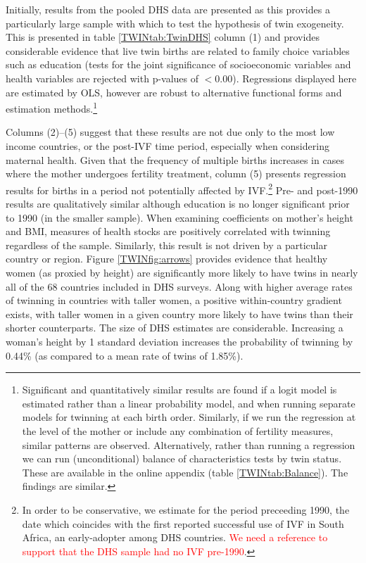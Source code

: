 \documentclass[subeqn]{article}
\begin{document}
\begin{spacing}{1.4}
Initially, results from the pooled DHS data are presented as this provides a 
particularly large sample with which to test the hypothesis of twin exogeneity. 
This is presented in table \ref{TWINtab:TwinDHS} column (1) and provides 
considerable evidence that live twin births are related to family choice 
variables such as education (tests for the joint significance of socioeconomic 
variables and health variables are rejected with p-values of $<$0.00).  
Regressions displayed here are estimated by OLS, however are robust to 
alternative functional forms and estimation methods.\footnote{Significant and 
quantitatively similar results are found if a logit model is estimated rather 
than a linear probability model, and when running separate models for twinning at 
each birth order. Similarly, if we run the regression at the level of the mother 
or include any combination of fertility measures, similar patterns are observed.
Alternatively, rather than running a regression we can run (unconditional) balance 
of characteristics tests by twin status.  These are available in the online 
appendix (table \ref{TWINtab:Balance}).  The findings are similar.}

Columns (2)--(5) suggest that these results are not due only to the most low 
income countries, or the post-IVF time period, especially when considering 
maternal health.  Given that the frequency of multiple births increases in 
cases where the mother undergoes fertility treatment, column (5) presents 
regression results for births in a period not potentially affected by 
IVF.\footnote{In order to be conservative, we estimate for the period 
preceeding 1990, the date which coincides with the first reported successful 
use of IVF in South Africa, an early-adopter among DHS countries. \textcolor{red}
{We need a reference to support that the DHS sample had no IVF pre-1990}.} Pre- and 
post-1990 results are qualitatively similar although education is no longer 
significant prior to 1990 (in the smaller sample). When examining coefficients
on mother's height and BMI, measures of health stocks are positively correlated 
with twinning regardless of the sample.  Similarly, this result is not driven 
by a particular country or region.  Figure \ref{TWINfig:arrows} provides 
evidence that healthy women (as proxied by height) are significantly more 
likely to have twins in nearly all of the 68 countries included in DHS surveys.  
Along with higher average rates of twinning in countries with taller women, a 
positive within-country gradient exists, with taller women in a given country 
more likely to have twins than their shorter counterparts. The size of DHS 
estimates are considerable. Increasing a woman's height by 1 standard deviation 
increases the probability of twinning by 0.44\% (as compared to a mean rate of 
twins of 1.85\%).


\end{spacing}
\end{document}
